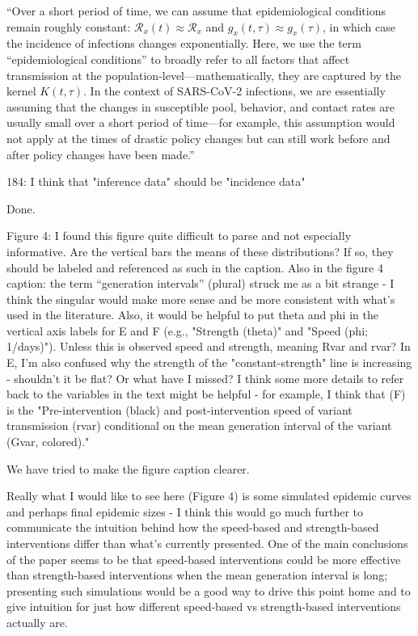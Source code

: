 \documentclass[12pt]{article}
\newcommand{\RR}{\ensuremath{{\mathcal R}}\xspace}
\newcommand{\revtext}{\textsf}
\begin{document}
``Over a short period of time, we can assume that epidemiological conditions remain roughly constant: $\RR_x(t) \approx \RR_x$ and $g_x(t, \tau) \approx g_x(\tau)$, in which case the incidence of infections changes exponentially.
Here, we use the term ``epidemiological conditions'' to broadly refer to all factors that affect transmission at the population-level---mathematically, they are captured by the kernel $K(t, \tau)$.
In the context of SARS-CoV-2 infections, we are essentially assuming that the changes in susceptible pool, behavior, and contact rates are usually small over a short period of time---for example, this assumption would not apply at the times of drastic policy changes but can still work before and after policy changes have been made.''

\revtext{184: I think that "inference data" should be "incidence data"}

Done.

\revtext{Figure 4: I found this figure quite difficult to parse and not especially informative. Are the vertical bars the means of these distributions? If so, they should be labeled and referenced as such in the caption. Also in the figure 4 caption: the term ``generation intervals'' (plural) struck me as a bit strange - I think the singular would make more sense and be more consistent with what's used in the literature. Also, it would be helpful to put theta and phi in the vertical axis labels for E and F (e.g., "Strength (theta)" and "Speed (phi; 1/days)"). Unless this is observed speed and strength, meaning Rvar and rvar? In E, I'm also confused why the strength of the "constant-strength" line is increasing - shouldn't it be flat? Or what have I missed? I think some more details to refer back to the variables in the text might be helpful - for example, I think that (F) is the "Pre-intervention (black) and post-intervention speed of variant transmission (rvar) conditional on the mean generation interval of the variant (Gvar, colored)."}

We have tried to make the figure caption clearer.

\revtext{Really what I would like to see here (Figure 4) is some simulated epidemic curves and perhaps final epidemic sizes - I think this would go much further to communicate the intuition behind how the speed-based and strength-based interventions differ than what's currently presented. One of the main conclusions of the paper seems to be that speed-based interventions could be more effective than strength-based interventions when the mean generation interval is long; presenting such simulations would be a good way to drive this point home and to give intuition for just how different speed-based vs strength-based interventions actually are.}
\end{document}
